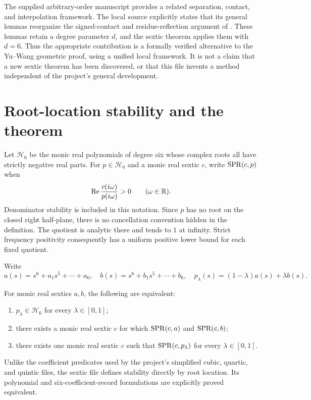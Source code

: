 \documentclass[11pt]{article}
\begin{document}
The supplied arbitrary-order manuscript \cite{referenceDraft} provides a related separation, contact, and interpolation framework. The local source explicitly states that its general  lemmas reorganize the signed-contact and residue-reflection argument of . These lemmas retain a degree parameter $d$, and the sextic theorem applies them with $d=6$. Thus the appropriate contribution is a formally verified alternative to the Yu--Wang geometric proof, using a unified local framework. It is not a claim that a new sextic theorem has been discovered, or that this file invents a method independent of the project's general development.

\section{Root-location stability and the theorem}
Let $\mathcal H_6$ be the monic real polynomials of degree six whose complex roots all have strictly negative real parts. For $p\in\mathcal H_6$ and a monic real sextic $c$, write $\mathrm{SPR}(c,p)$ when
\begin{equation}\label{eq:spr}
 \operatorname{Re}\frac{c(i\omega)}{p(i\omega)}>0\qquad(\omega\in\mathbb R).
\end{equation}
Denominator stability is included in this notation. Since $p$ has no root on the closed right half-plane, there is no cancellation convention hidden in the definition. The quotient is analytic there and tends to $1$ at infinity. Strict frequency positivity consequently has a uniform positive lower bound for each fixed quotient.

Write
\[
 a(s)=s^6+a_1s^5+\cdots+a_6,\quad
 b(s)=s^6+b_1s^5+\cdots+b_6,\quad
 p_\lambda(s)=(1-\lambda)a(s)+\lambda b(s).
\]
\begin{theorem}\label{thm:main}
For monic real sextics $a,b$, the following are equivalent:
\begin{enumerate}
\item $p_\lambda\in\mathcal H_6$ for every $\lambda\in[0,1]$;
\item there exists a monic real sextic $c$ for which $\mathrm{SPR}(c,a)$ and $\mathrm{SPR}(c,b)$;
\item there exists one monic real sextic $c$ such that $\mathrm{SPR}(c,p_\lambda)$ for every $\lambda\in[0,1]$.
\end{enumerate}
\end{theorem}
Unlike the coefficient predicates used by the project's simplified cubic, quartic, and quintic files, the sextic file defines stability directly by root location. Its polynomial and six-coefficient-record formulations are explicitly proved equivalent.
\end{document}
